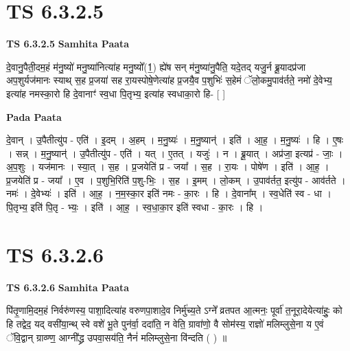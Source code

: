 \documentclass[17pt]{extarticle}
\begin{document}
\section*{ TS 6.3.2.5 }

\textbf{TS 6.3.2.5 } \newline
\textbf{Samhita Paata} \newline

दे॒वानु॒पैती॒दम॒हं म॑नु॒ष्यो॑ मनु॒ष्या॑नित्या॑ह मनु॒ष्यो᳚(1॒) ह्ये॑ष सन् म॑नु॒ष्या॑नु॒पैति॒ यदे॒तद् यजु॒र्न ब्रू॒यादप्र॑जा अप॒शुर्यज॑मानः स्याथ् स॒ह प्र॒जया॑ सह रा॒यस्पोषे॒णेत्या॑ह प्र॒जयै॒व प॒शुभिः॑ स॒हेमं ॅलो॒कमु॒पाव॑र्तते॒ नमो॑ दे॒वेभ्य॒ इत्या॑ह नमस्का॒रो हि दे॒वानाꣳ॑ स्व॒धा पि॒तृभ्य॒ इत्या॑ह स्वधाका॒रो हि- [  ] \newline

\textbf{Pada Paata} \newline

दे॒वान् । उ॒पैतीत्यु॑प - एति॑ । इ॒दम् । अ॒हम् । म॒नु॒ष्यः॑ । म॒नु॒ष्यान्॑ । इति॑ । आ॒ह॒ । म॒नु॒ष्यः॑ । हि । ए॒षः । सन्न् । म॒नु॒ष्यान्॑ । उ॒पैतीत्यु॑प - एति॑ । यत् । ए॒तत् । यजुः॑ । न । ब्रू॒यात् । अप्र॑जा॒ इत्यप्र॑ - जाः॒ । अ॒प॒शुः । यज॑मानः । स्या॒त् । स॒ह । प्र॒जयेति॑ प्र - जया᳚ । स॒ह । रा॒यः । पोषे॑ण । इति॑ । आ॒ह॒ । प्र॒जयेति॑ प्र - जया᳚ । ए॒व । प॒शुभि॒रिति॑ प॒शु-भिः॒ । स॒ह । इ॒मम् । लो॒कम् । उ॒पाव॑र्तत॒ इत्यु॑प - आव॑र्तते । नमः॑ । दे॒वेभ्यः॑ । इति॑ । आ॒ह॒ । न॒म॒स्का॒र इति॑ नमः - का॒रः । हि । दे॒वाना᳚म् । स्व॒धेति॑ स्व - धा । पि॒तृभ्य॒ इति॑ पि॒तृ - भ्यः॒ । इति॑ । आ॒ह॒ । स्व॒धा॒का॒र इति॑ स्वधा - का॒रः । हि ।  \newline




\section*{ TS 6.3.2.6 }

\textbf{TS 6.3.2.6 } \newline
\textbf{Samhita Paata} \newline

पि॑तृ॒णामि॒दम॒हं निर्वरु॑णस्य॒ पाशा॒दित्या॑ह वरुणपा॒शादे॒व निर्मु॑च्य॒ते ऽग्ने᳚ व्रतपत आ॒त्मनः॒ पूर्वा॑ त॒नूरा॒देयेत्या॑हुः॒ को हि तद्वेद॒ यद् वसी॑या॒न्थ् स्वे वशे॑ भू॒ते पुन॑र्वा॒ ददा॑ति॒ न वेति॒ ग्रावा॑णो॒ वै सोम॑स्य॒ राज्ञो॑ मलिम्लुसे॒ना य ए॒वं ॅवि॒द्वान् ग्राव्ण्ण॒॒ आग्नी᳚द्ध्र उपवा॒सय॑ति॒ नैनं॑ मलिम्लुसे॒ना वि॑न्दति ( ) ॥ \newline
\end{document}
